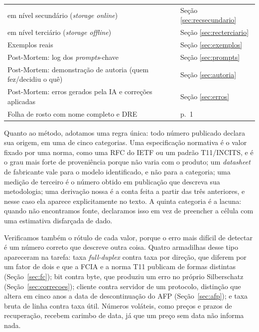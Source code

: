 \documentclass[11pt,a4paper]{article}
\begin{document}
\begin{table}[H]
{\begin{tabular}{@{}p{10.6cm}l@{}}
\quad em nível secundário (\textit{storage online}) & Seção \ref{sec:recsecundario} \\
\quad em nível terciário (\textit{storage offline}) & Seção \ref{sec:recterciario} \\
Exemplos reais & Seção \ref{sec:exemplos} \\
Post-Mortem: log dos \textit{prompts}-chave & Seção \ref{sec:prompts} \\
Post-Mortem: demonstração de autoria (quem fez/decidiu o quê) & Seção \ref{sec:autoria} \\
Post-Mortem: erros gerados pela IA e correções aplicadas & Seção \ref{sec:erros} \\
Folha de rosto com nome completo e DRE & p.\ 1 \\
\bottomrule
\end{tabular}}
\end{table}

Quanto ao método, adotamos uma regra única: todo número publicado declara sua origem, em uma de
cinco categorias. Uma especificação normativa é o valor fixado por uma norma, como uma RFC do IETF ou
um padrão T11/INCITS, e é o grau mais forte de proveniência porque não varia com o produto; um
\textit{datasheet} de fabricante vale para o modelo identificado, e não para a categoria; uma medição
de terceiro é o número obtido em publicação que descreva sua metodologia; uma derivação nossa é a
conta feita a partir das três anteriores, e nesse caso ela aparece explicitamente no texto. A quinta
categoria é a lacuna: quando não encontramos fonte, declaramos isso em vez de preencher a célula com
uma estimativa disfarçada de dado.

Verificamos também o rótulo de cada valor, porque o erro mais difícil de detectar é um número correto
que descreve outra coisa. Quatro armadilhas desse tipo apareceram na tarefa: taxa \textit{full-duplex}
contra taxa por direção, que diferem por um fator de dois e que a FCIA e a norma T11 publicam de
formas distintas (Seção~\ref{sec:fc}); bit contra byte, que produziu um erro no próprio Silberschatz
(Seção~\ref{sec:correcoes}); cliente contra servidor de um protocolo, distinção que altera em cinco
anos a data de descontinuação do AFP (Seção~\ref{sec:afp}); e taxa bruta de linha contra taxa útil.
Números voláteis, como preços e prazos de recuperação, recebem carimbo de data, já que um preço sem
data não informa nada.
\end{document}
